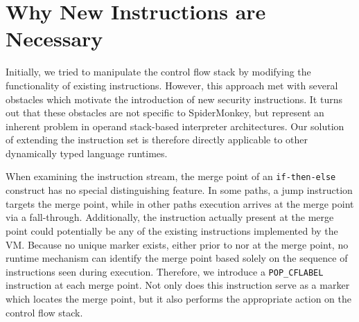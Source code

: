 \documentclass[preprint]{sigplanconf}
\begin{document}



\section{Why New Instructions are Necessary}
\label{sec:bytecodes-are-necessary}

Initially, we tried to manipulate the control flow stack by modifying the functionality of existing instructions.
However, this approach met with several obstacles which motivate the introduction of new security instructions.
It turns out that these obstacles are not specific to SpiderMonkey, but represent an inherent problem in operand stack-based interpreter architectures.
Our solution of extending the instruction set is therefore directly applicable to other dynamically typed language runtimes.

When examining the instruction stream, the merge point of an \texttt{if-then-else} construct has no special distinguishing feature.
In some paths, a jump instruction targets the merge point, while in other paths execution arrives at the merge point via a fall-through.
Additionally, the instruction actually present at the merge point could potentially be any of the existing instructions implemented by the VM.
Because no unique marker exists, either prior to nor at the merge point, no runtime mechanism can identify the merge point based solely on the sequence of instructions seen during execution.
Therefore, we introduce a \texttt{POP\_CFLABEL} instruction at each merge point.
Not only does this instruction serve as a marker which locates the merge point, but it also performs the appropriate action on the control flow stack.
\end{document}
